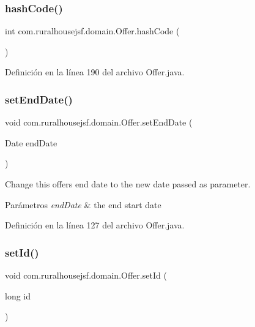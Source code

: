 \subsubsection{\texorpdfstring{hashCode()}{hashCode()}}
{\footnotesize\ttfamily int com.\+ruralhousejsf.\+domain.\+Offer.\+hash\+Code (\begin{DoxyParamCaption}{ }\end{DoxyParamCaption})}



Definición en la línea 190 del archivo Offer.\+java.

\mbox{\label{classcom_1_1ruralhousejsf_1_1domain_1_1_offer_a4ee5091e976e14c9b34817e1c8225e01}} 
\subsubsection{\texorpdfstring{setEndDate()}{setEndDate()}}
{\footnotesize\ttfamily void com.\+ruralhousejsf.\+domain.\+Offer.\+set\+End\+Date (\begin{DoxyParamCaption}\item[{Date}]{end\+Date }\end{DoxyParamCaption})}



Change this offers end date to the new date passed as parameter. 


\begin{DoxyParams}{Parámetros}
{\em end\+Date} & the end start date \\
\hline
\end{DoxyParams}


Definición en la línea 127 del archivo Offer.\+java.

\mbox{\label{classcom_1_1ruralhousejsf_1_1domain_1_1_offer_a470323b09c0c64417eb21c748d008045}} 
\subsubsection{\texorpdfstring{setId()}{setId()}}
{\footnotesize\ttfamily void com.\+ruralhousejsf.\+domain.\+Offer.\+set\+Id (\begin{DoxyParamCaption}\item[{long}]{id }\end{DoxyParamCaption})}



